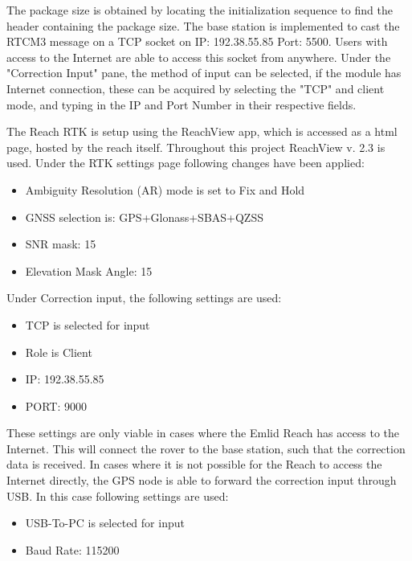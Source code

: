 The package size is obtained by locating the initialization sequence to find the header containing the package size. The base station is implemented to cast the RTCM3 message on a TCP socket on IP: 192.38.55.85 Port: 5500. Users with access to the Internet are able to access this socket from anywhere. Under the "Correction Input" pane, the method of input can be selected, if the module has Internet connection, these can be acquired by selecting the "TCP" and client mode, and typing in the IP and Port Number in their respective fields.

The Reach RTK is setup using the ReachView app, which is accessed as a html page, hosted by the reach itself. 
Throughout this project ReachView v. 2.3 is used.
Under the RTK settings page following changes have been applied:
	\begin{itemize}
		\item Ambiguity Resolution (AR) mode is set to Fix and Hold
		\item GNSS selection is: GPS+Glonass+SBAS+QZSS
		\item SNR mask: 15
		\item Elevation Mask Angle: 15
	\end{itemize}
Under Correction input, the following settings are used: 
	\begin{itemize}
		\item TCP is selected for input
		\item Role is Client
		\item IP: 192.38.55.85
		\item PORT: 9000
	\end{itemize}
These settings are only viable in cases where the Emlid Reach has access to the Internet.
This will connect the rover to the base station, such that the correction data is received. 
In cases where it is not possible for the Reach to access the Internet directly, the GPS node is able to forward the correction input through USB. 
In this case following settings are used: 
	\begin{itemize}
		\item USB-To-PC is selected for input
		\item Baud Rate: 115200
	\end{itemize}




